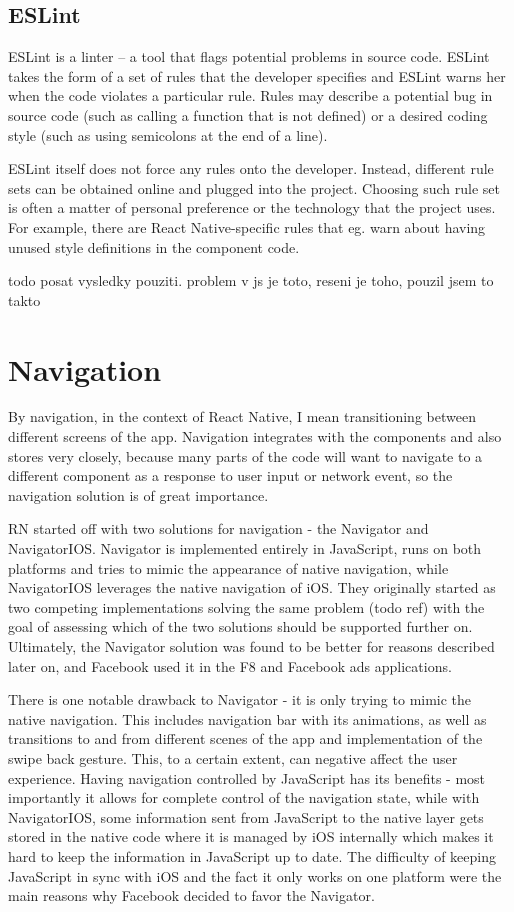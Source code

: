 \subsection{ESLint}

ESLint is a linter -- a tool that flags potential problems in source code. ESLint takes the form of a set of rules that the developer specifies and ESLint warns her when the code violates a particular rule. Rules may describe a potential bug in source code (such as calling a function that is not defined) or a desired coding style (such as using semicolons at the end of a line).

ESLint itself does not force any rules onto the developer. Instead, different rule sets can be obtained online and plugged into the project. Choosing such rule set is often a matter of personal preference or the technology that the project uses. For example, there are React Native-specific rules that eg. warn about having unused style definitions in the component code.

todo posat vysledky pouziti. problem v js je toto, reseni je toho, pouzil jsem to takto

\section{Navigation}

By navigation, in the context of React Native, I mean transitioning between different screens of the app. Navigation integrates with the components and also stores very closely, because many parts of the code will want to navigate to a different component as a response to user input or network event, so the navigation solution is of great importance. 

RN started off with two solutions for navigation - the Navigator and NavigatorIOS. Navigator is implemented entirely in JavaScript, runs on both platforms and tries to mimic the appearance of native navigation, while NavigatorIOS leverages the native navigation of iOS.
They originally started as two competing implementations solving the same problem (todo ref) with the goal of assessing which of the two solutions should be supported further on. Ultimately, the Navigator solution was found to be better for reasons described later on, and Facebook used it in the F8 and Facebook ads applications. 


There is one notable drawback to Navigator - it is only trying to mimic the native navigation. This includes navigation bar with its animations, as well as transitions to and from different scenes of the app and implementation of the swipe back gesture. This, to a certain extent, can negative affect the user experience.
Having navigation controlled by JavaScript has its benefits - most importantly it allows for complete control of the navigation state, while with NavigatorIOS, some information sent from JavaScript to the native layer gets stored in the native code where it is managed by iOS internally which makes it hard to keep the information in JavaScript up to date. The difficulty of keeping JavaScript in sync with iOS and the fact it only works on one platform were the main reasons why Facebook decided to favor the Navigator.

